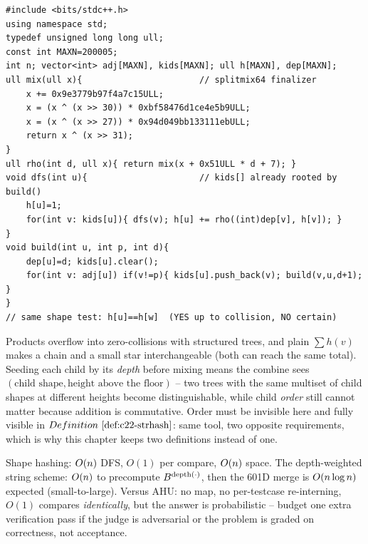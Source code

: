 \begin{lstlisting}[caption={Order-free shape hash: one DFS, O(1) compares afterwards. rho is a splitmix64 mix of (depth, child hash); sum makes it commutative. ASCII only, identifiers without underscores}, label={lst:c22-shapehash}]
#include <bits/stdc++.h>
using namespace std;
typedef unsigned long long ull;
const int MAXN=200005;
int n; vector<int> adj[MAXN], kids[MAXN]; ull h[MAXN], dep[MAXN];
ull mix(ull x){                       // splitmix64 finalizer
    x += 0x9e3779b97f4a7c15ULL;
    x = (x ^ (x >> 30)) * 0xbf58476d1ce4e5b9ULL;
    x = (x ^ (x >> 27)) * 0x94d049bb133111ebULL;
    return x ^ (x >> 31);
}
ull rho(int d, ull x){ return mix(x + 0x51ULL * d + 7); }
void dfs(int u){                      // kids[] already rooted by build()
    h[u]=1;
    for(int v: kids[u]){ dfs(v); h[u] += rho((int)dep[v], h[v]); }
}
void build(int u, int p, int d){
    dep[u]=d; kids[u].clear();
    for(int v: adj[u]) if(v!=p){ kids[u].push_back(v); build(v,u,d+1); }
}
// same shape test: h[u]==h[w]  (YES up to collision, NO certain)
\end{lstlisting}

\begin{insightbox}
Products overflow into zero-collisions with structured trees, and plain
\(\sum h(v)\) makes a chain and a small star interchangeable (both can reach the
same total).  Seeding each child by its \emph{depth} before mixing means the
combine sees \((\text{child shape}, \text{height above the floor})\) -- two trees
with the same multiset of child shapes at different heights become distinguishable,
while child \emph{order} still cannot matter because addition is commutative.  Order
must be invisible here and fully visible in \(\defref{c22-strhash}\): same tool,
two opposite requirements, which is why this chapter keeps two definitions instead
of one.
\end{insightbox}

\begin{complexitybox}
Shape hashing: \(O(n)\) DFS, \(O(1)\) per compare, \(O(n)\) space.  The
depth-weighted string scheme: \(O(n)\) to precompute \(B^{\operatorname{depth}(\cdot)}\),
then the 601D merge is \(O(n\log n)\) expected (small-to-large).  Versus
AHU: no map, no per-testcase re-interning, \(O(1)\) compares \emph{identically},
but the answer is probabilistic -- budget one extra verification pass if the judge
is adversarial or the problem is graded on correctness, not acceptance.
\end{complexitybox}

